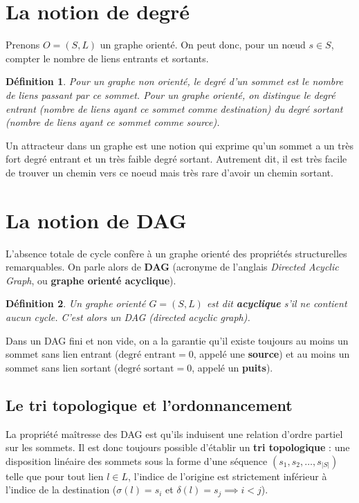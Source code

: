 \documentclass[11pt,a4paper]{report}
\newtheorem{definition}{Définition}
\begin{document}
	\section{La notion de degré}
	
	Prenons $O=(S,L)$ un graphe orienté. On peut donc, pour un nœud $s \in S$, compter le nombre de liens entrants et sortants. 
	
	\begin{definition}
		Pour un graphe non orienté, le degré d'un sommet est le nombre de liens passant par ce sommet. Pour un graphe orienté, on distingue le degré entrant (nombre de liens ayant ce sommet comme destination) du degré sortant (nombre de liens ayant ce sommet comme source). 
	\end{definition}
	
	Un attracteur dans un graphe est une notion qui exprime qu'un sommet a un très fort degré entrant et un très faible degré sortant. Autrement dit, il est \og{}très facile\fg{} de trouver un chemin vers ce noeud mais très rare d'avoir un chemin sortant. 
	
	\section{La notion de DAG}
	
	L'absence totale de cycle confère à un graphe orienté des propriétés structurelles remarquables. On parle alors de \textbf{DAG} (acronyme de l'anglais \textit{Directed Acyclic Graph}, ou \textbf{graphe orienté acyclique}).
	
	\begin{definition}
		Un graphe orienté $G = (S, L)$ est dit \textbf{acyclique} s'il ne contient aucun cycle. C'est alors un DAG (directed acyclic graph). 
	\end{definition}
	
	Dans un DAG fini et non vide, on a la garantie qu'il existe toujours au moins un sommet sans lien entrant ($\text{degré entrant} = 0$, appelé une \textbf{source}) et au moins un sommet sans lien sortant ($\text{degré sortant} = 0$, appelé un \textbf{puits}). 
	
	\subsection*{Le tri topologique et l'ordonnancement}
	
	La propriété maîtresse des DAG est qu'ils induisent une relation d'ordre partiel sur les sommets. Il est donc toujours possible d'établir un \textbf{tri topologique} : une disposition linéaire des sommets sous la forme d'une séquence $(s_1, s_2, \dots, s_{|S|})$ telle que pour tout lien $l \in L$, l'indice de l'origine est strictement inférieur à l'indice de la destination ($\sigma(l) = s_i$ et $\delta(l) = s_j \implies i < j$).
	
\end{document}
